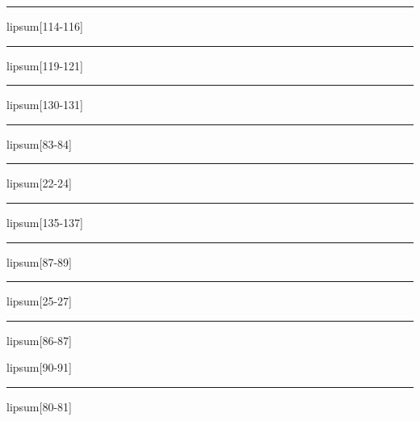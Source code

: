 \documentclass[11pt,a4paper]{article}
\begin{document}
\begin{simplewrap}
  \textcolor{brown!50}{\rule{3.9cm}{5.5cm}}
\end{simplewrap}
lipsum[114-116]

\begin{simplewrap}
  \textcolor{teal!47}{\rule{3.2cm}{6.1cm}}
\end{simplewrap}
lipsum[119-121]

\begin{simplewrap}
  \textcolor{blue!33}{\rule{5.5cm}{2.6cm}}
\end{simplewrap}
lipsum[130-131]

\begin{simplewrap}
  \textcolor{magenta!60}{\rule{5.2cm}{2.3cm}}
\end{simplewrap}
lipsum[83-84]

\begin{simplewrap}
  \textcolor{cyan!19}{\rule{5.9cm}{5.6cm}}
\end{simplewrap}
lipsum[22-24]

\begin{simplewrap}
  \textcolor{cyan!12}{\rule{3.7cm}{5.5cm}}
\end{simplewrap}
lipsum[135-137]

\begin{simplewrap}
  \textcolor{cyan!33}{\rule{4.1cm}{4.3cm}}
\end{simplewrap}
lipsum[87-89]

\begin{simplewrap}
  \textcolor{blue!60}{\rule{4.9cm}{4.7cm}}
\end{simplewrap}
lipsum[25-27]

\begin{simplewrap}
  \textcolor{pink!28}{\rule{3.8cm}{8.8cm}}
\end{simplewrap}
lipsum[86-87]

lipsum[90-91]

\begin{simplewrap}
  \textcolor{violet!51}{\rule{5.1cm}{5.1cm}}
\end{simplewrap}
lipsum[80-81]
\end{document}
